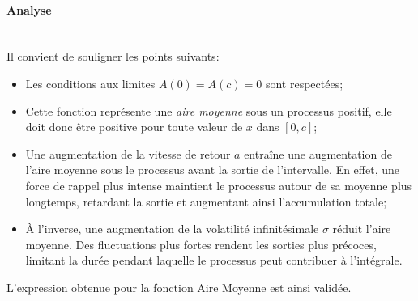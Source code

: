 \FloatBarrier\paragraph{Analyse}\phantom{}\\
Il convient de souligner les points suivants:
\begin{itemize}
    \item Les conditions aux limites $A(0)=A(c)=0$ sont respectées;
    \item Cette fonction représente une \textit{aire moyenne} sous un processus positif, elle doit donc être positive pour toute valeur de $x$ dans $[0,c]$;
    \item Une augmentation de la vitesse de retour $a$ entraîne une augmentation de l'aire moyenne sous le processus avant la sortie de l'intervalle. En effet, une force de rappel plus intense maintient le processus autour de sa moyenne plus longtemps, retardant la sortie et augmentant ainsi l'accumulation totale;
    \item À l'inverse, une augmentation de la volatilité infinitésimale $\sigma$ réduit l'aire moyenne. Des fluctuations plus fortes rendent les sorties plus précoces, limitant la durée pendant laquelle le processus peut contribuer à l'intégrale.
\end{itemize}

L'expression obtenue pour la fonction Aire Moyenne est ainsi validée.
